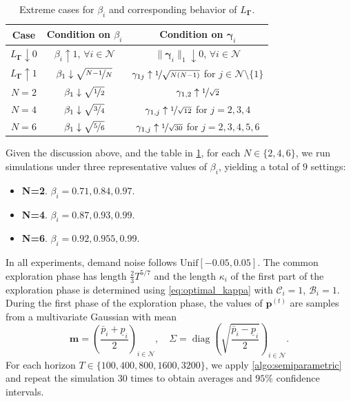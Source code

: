 \documentclass{article} %
\begin{document}
\begin{table}[t]
\caption{Extreme cases for $\beta_i$ and corresponding behavior of $L_{\boldsymbol{\Gamma}}$.}
\label{table:summary_contraction}
\begin{center}
\begin{tabular}{c|c|c}
\toprule
\textbf{Case} & \textbf{Condition on $\beta_i$} & \textbf{Condition on $\boldsymbol{\gamma}_i$} \\
\midrule
$L_{\boldsymbol{\Gamma}} \downarrow 0$ & $\beta_i \uparrow 1$, $\forall i \in \mathcal{N}$ & $\|\boldsymbol{\gamma}_i\|_1 \downarrow 0$, $\forall i \in \mathcal{N}$ \\
\midrule
$L_{\boldsymbol{\Gamma}} \uparrow 1$ & $\beta_1 \downarrow \sqrt{\nicefrac{N-1}{N}}$ &
$\gamma_{1j}\uparrow \nicefrac{1}{\sqrt{N(N-1)}}$ for $j \in \mathcal{N} \setminus \{1\}$ \\ 
$N=2$ & $\beta_1 \downarrow \sqrt{\nicefrac{1}{2}}$ & $\gamma_{1,2}\uparrow \nicefrac{1}{\sqrt{2}}$ \\ 
$N=4$ & $\beta_1 \downarrow \sqrt{\nicefrac{3}{4}}$ & $\gamma_{1,j}\uparrow \nicefrac{1}{\sqrt{12}}$ for $j =2,3,4$ \\ 
$N=6$ & $\beta_1 \downarrow \sqrt{\nicefrac{5}{6}} $ & $\gamma_{1,j}\uparrow \nicefrac{1}{\sqrt{30}}$ for $j =2,3,4,5,6$ \\
\bottomrule
\end{tabular}
\end{center}
\end{table}

Given the discussion above, and the table in \cref{table:summary_contraction}, for each $N \in \{2,4,6\}$, we run simulations under three representative values of $\beta_i$, yielding a total of $9$ settings:
\begin{itemize}
    \item \textbf{N=2}. $\beta_i = 0.71, 0.84, 0.97$.
    \item \textbf{N=4}. $\beta_i = 0.87, 0.93, 0.99$.
    \item \textbf{N=6}. $\beta_i = 0.92, 0.955, 0.99$.
\end{itemize}

In all experiments, demand noise follows $\text{Unif}[-0.05,0.05]$. The common exploration phase has length $\frac{2}{3}T^{5/7}$ and the length $\kappa_i$ of the first part of the exploration phase is determined using \cref{eq:optimal_kappa} with $\mathscr{C}_i=1$, $\mathscr{B}_i=1$. During the first phase of the exploration phase, the values of $\mathbf{p}^{(t)}$ are samples from a multivariate Gaussian with mean 
$$
\mathbf{m} = \left(\frac{\bar{p}_i+\underline{p}_i}{2}\right)_{i \in \mathcal{N}},\quad \Sigma = \operatorname{diag}\left(\sqrt{\frac{\bar{p}_i-\underline{p}_i}{2}}\right)_{i \in \mathcal{N}}.
$$
For each horizon $T \in \{100, 400, 800, 1600, 3200\}$, we apply \cref{algo:semiparametric} and repeat the simulation $30$ times to obtain averages and $95\%$ confidence intervals.
\end{document}
